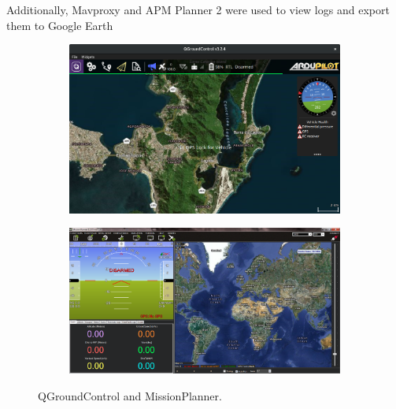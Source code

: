 Additionally, Mavproxy\cite{mavproxy} and APM Planner 2\cite{apm2} were used to view logs and export them to Google Earth

\begin{figure}[h]
  \centering
  \begin{subfigure}{.8\textwidth}
    \centering
    \includegraphics[width=\linewidth]{figs/qgc.png}
  \end{subfigure}%

  \begin{subfigure}{.8\textwidth}
    \centering
    \includegraphics[width=\linewidth]{figs/missionplanner.png}

  \end{subfigure}
  \caption{QGroundControl and MissionPlanner.}
  \label{fig:groudstations}
\end{figure}